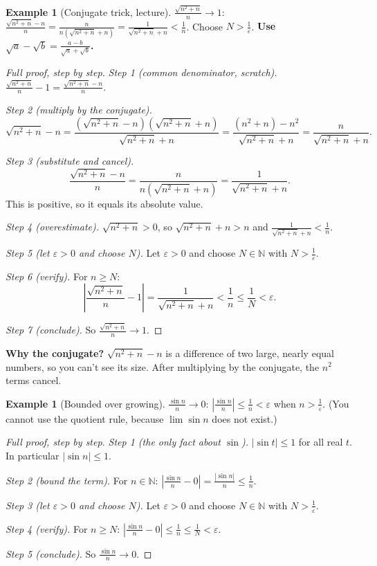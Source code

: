 \documentclass[11pt]{article}
\theoremstyle{definition}
\newtheorem{ex}[defn]{Example}
\newcommand{\N}{\mathbb{N}}
\newcommand{\eps}{\varepsilon}
\newcommand{\key}[1]{\textcolor{red!70!black}{\textbf{#1}}}
\begin{document}
\begin{ex}[Conjugate trick, lecture]
$\frac{\sqrt{n^2+n}}{n}\to1$:
$\frac{\sqrt{n^2+n}-n}{n}=\frac{n}{n(\sqrt{n^2+n}+n)}=\frac1{\sqrt{n^2+n}+n}<\frac1n$.
Choose $N>\frac1\eps$. \key{Use $\sqrt a-\sqrt b=\frac{a-b}{\sqrt a+\sqrt b}$.}

\begin{proof}[Full proof, step by step]
\emph{Step 1 (common denominator, scratch).}
$\frac{\sqrt{n^2+n}}{n}-1=\frac{\sqrt{n^2+n}-n}{n}$.

\emph{Step 2 (multiply by the conjugate).}
\[
\sqrt{n^2+n}-n=\frac{(\sqrt{n^2+n}-n)(\sqrt{n^2+n}+n)}{\sqrt{n^2+n}+n}
=\frac{(n^2+n)-n^2}{\sqrt{n^2+n}+n}=\frac{n}{\sqrt{n^2+n}+n}.
\]

\emph{Step 3 (substitute and cancel).}
\[
\frac{\sqrt{n^2+n}-n}{n}=\frac{n}{n(\sqrt{n^2+n}+n)}=\frac1{\sqrt{n^2+n}+n}.
\]
This is positive, so it equals its absolute value.

\emph{Step 4 (overestimate).} $\sqrt{n^2+n}>0$, so
$\sqrt{n^2+n}+n>n$ and $\frac1{\sqrt{n^2+n}+n}<\frac1n$.

\emph{Step 5 (let $\eps>0$ and choose $N$).} Let $\eps>0$ and choose
$N\in\N$ with $N>\frac1\eps$.

\emph{Step 6 (verify).} For $n\ge N$:
\[
\left|\frac{\sqrt{n^2+n}}{n}-1\right|=\frac1{\sqrt{n^2+n}+n}<\frac1n\le\frac1N<\eps.
\]

\emph{Step 7 (conclude).} So $\frac{\sqrt{n^2+n}}{n}\to1$.
\end{proof}
\noindent\key{Why the conjugate?} $\sqrt{n^2+n}-n$ is a difference of two
large, nearly equal numbers, so you can't see its size. After multiplying
by the conjugate, the $n^2$ terms cancel.
\end{ex}

\begin{ex}[Bounded over growing]
$\frac{\sin n}{n}\to0$: $\left|\frac{\sin n}{n}\right|\le\frac1n<\eps$ when
$n>\frac1\eps$. (You cannot use the quotient rule, because $\lim\sin n$ does
not exist.)

\begin{proof}[Full proof, step by step]
\emph{Step 1 (the only fact about $\sin$).} $|\sin t|\le1$ for all real
$t$. In particular $|\sin n|\le1$.

\emph{Step 2 (bound the term).} For $n\in\N$:
$\left|\frac{\sin n}{n}-0\right|=\frac{|\sin n|}{n}\le\frac1n$.

\emph{Step 3 (let $\eps>0$ and choose $N$).} Let $\eps>0$ and choose
$N\in\N$ with $N>\frac1\eps$.

\emph{Step 4 (verify).} For $n\ge N$:
$\left|\frac{\sin n}n-0\right|\le\frac1n\le\frac1N<\eps$.

\emph{Step 5 (conclude).} So $\frac{\sin n}{n}\to0$.
\end{proof}
\end{ex}
\end{document}
